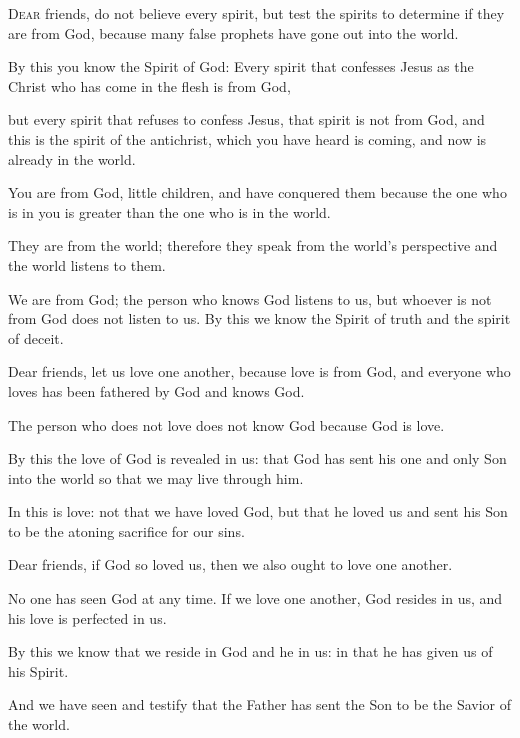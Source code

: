 \begin{scripture}
 \allowchapbreak\hypertarget{ch-1john-4}{}\lettrine[lines=5]{\color{general}D}{\textsc{ear}} friends, do not believe every spirit, but test the spirits to determine if they are from God, because many false prophets have gone out into the world.\everypar{}
 By this you know the Spirit of God: Every spirit that confesses Jesus as the Christ who has come in the flesh is from God,
 but every spirit that refuses to confess Jesus, that spirit is not from God, and this is the spirit of the antichrist, which you have heard is coming, and now is already in the world.
\everypar{}

 You are from God, little children, and have conquered them because the one who is in you is greater than the one who is in the world.
 They are from the world; therefore they speak from the world's perspective and the world listens to them.
 We are from God; the person who knows God listens to us, but whoever is not from God does not listen to us. By this we know the Spirit of truth and the spirit of deceit.
\everypar{}

 Dear friends, let us love one another, because love is from God, and everyone who loves has been fathered by God and knows God.
 The person who does not love does not know God because God is love.
 By this the love of God is revealed in us: that God has sent his one and only Son into the world so that we may live through him.
 In this is love: not that we have loved God, but that he loved us and sent his Son to be the atoning sacrifice for our sins.
\everypar{}

 Dear friends, if God so loved us, then we also ought to love one another.
 No one has seen God at any time. If we love one another, God resides in us, and his love is perfected in us.
 By this we know that we reside in God and he in us: in that he has given us of his Spirit.
 And we have seen and testify that the Father has sent the Son to be the Savior of the world.
\everypar{}


\end{scripture}
